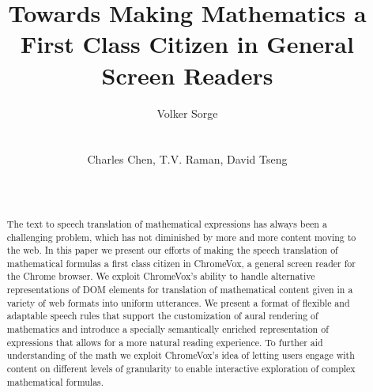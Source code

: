 \documentclass{sig-alternate}
\begin{document}
\title{Towards Making Mathematics a First Class Citizen in General Screen Readers}

\author{
  \alignauthor Volker Sorge\\
  \\
  \\
\alignauthor
Charles Chen, T.V. Raman, David Tseng\\
       \\
       \\
}


\maketitle 
\begin{abstract}
  The text to speech translation of mathematical expressions has always been a
  challenging problem, which has not diminished by more and more content moving
  to the web. In this paper we present our efforts of making the speech
  translation of mathematical formulas a first class citizen in ChromeVox, a
  general screen reader for the Chrome browser. We exploit ChromeVox's ability
  to handle alternative representations of DOM elements for translation of
  mathematical content given in a variety of web formats into uniform
  utterances. We present a format of flexible and adaptable speech rules that
  support the customization of aural rendering of mathematics and introduce a
  specially semantically enriched representation of expressions that allows for
  a more natural reading experience. To further aid understanding of the math we
  exploit ChromeVox's idea of letting users engage with content on different
  levels of granularity to enable interactive exploration of complex
  mathematical formulas.
\end{abstract}

\end{document}
